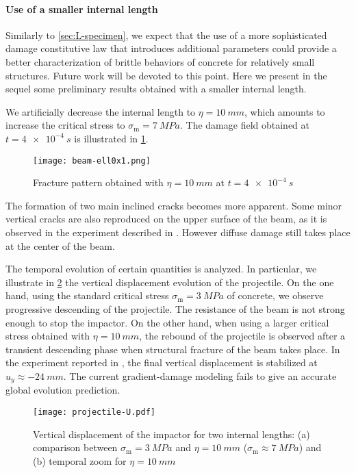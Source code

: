 \paragraph{Use of a smaller internal length} Similarly to \cref{sec:L-specimen}, we expect that the use of a more sophisticated damage constitutive law that introduces additional parameters could provide a better characterization of brittle behaviors of concrete for relatively small structures. Future work will be devoted to this point. Here we present in the sequel some preliminary results obtained with a smaller internal length. 

We artificially decrease the internal length to $\eta=\SI{10}{mm}$, which amounts to increase the critical stress to $\sigma_\mathrm{m}=\SI{7}{MPa}$. The damage field obtained at $t=\SI{4e-4}{s}$ is illustrated in \cref{fig:beamell0x1}.
\begin{figure}[htbp]
\centering
\texttt{[image: beam-ell0x1.png]}
\caption{Fracture pattern obtained with $\eta=\SI{10}{mm}$ at $t=\SI{4e-4}{s}$} \label{fig:beamell0x1}
\end{figure}
The formation of two main inclined cracks becomes more apparent. Some minor vertical cracks are also reproduced on the upper surface of the beam, as it is observed in the experiment described in \cite{OzboltSharma:2011}. However diffuse damage still takes place at the center of the beam.

The temporal evolution of certain quantities is analyzed. In particular, we illustrate in \cref{fig:projectileU} the vertical displacement evolution of the projectile. On the one hand, using the standard critical stress $\sigma_\mathrm{m}=\SI{3}{MPa}$ of concrete, we observe progressive descending of the projectile. The resistance of the beam is not strong enough to stop the impactor. On the other hand, when using a larger critical stress obtained with $\eta=\SI{10}{mm}$, the rebound of the projectile is observed after a transient descending phase when structural fracture of the beam takes place. In the experiment reported in \cite{Guilbaud:2015}, the final vertical displacement is stabilized at $u_y\approx \SI{-24}{mm}$. The current gradient-damage modeling fails to give an accurate global evolution prediction.
\begin{figure}[htbp]
\centering
\texttt{[image: projectile-U.pdf]}
\caption{Vertical displacement of the impactor for two internal lengths: (a) comparison between $\sigma_\mathrm{m}=\SI{3}{MPa}$ and $\eta=\SI{10}{mm}$ ($\sigma_\mathrm{m}\approx \SI{7}{MPa}$) and (b) temporal zoom for $\eta=\SI{10}{mm}$} \label{fig:projectileU}
\end{figure}

